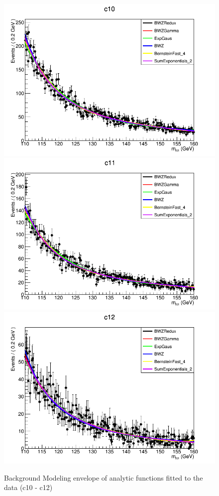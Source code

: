 \begin{figure}[htbp]
  \centering
  \includegraphics[width=0.65\linewidth]{figures/ch_higgs/backgroundmodel/uf_bdt/backgroundFits__c10__bkgModels.png}\\
  \includegraphics[width=0.65\linewidth]{figures/ch_higgs/backgroundmodel/uf_bdt/backgroundFits__c11__bkgModels.png}\\
  \includegraphics[width=0.65\linewidth]{figures/ch_higgs/backgroundmodel/uf_bdt/backgroundFits__c12__bkgModels.png}
  \caption{Background Modeling envelope of analytic functions fitted to the data (c10 - c12)}
  \label{fig:higgs_bmodel_bdtc10c12}
\end{figure}